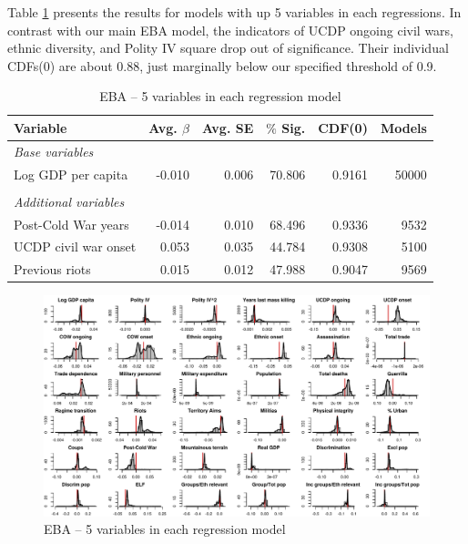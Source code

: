 Table \ref{tab:mk-5vars} presents the results for models with up 5 variables in each regressions. In contrast with our main EBA model, the indicators of UCDP ongoing civil wars, ethnic diversity, and Polity IV square drop out of significance. Their individual CDFs(0) are about 0.88, just marginally below our specified threshold of 0.9.

\vspace{1cm}

\begin{table}[!htpb]
\centering
\begin{tabular}{lrrrrr}
\hline
\textbf{Variable} & \textbf{Avg. $\beta$} & \textbf{Avg. SE} & \textbf{$\%$ Sig.} & \textbf{CDF(0)} & \textbf{Models} \\ \hline
\textit{Base variables} &  &  &  &  &  \\
Log GDP per capita & -0.010 & 0.006 & 70.806 & 0.9161 & 50000 \\
 &  &  &  &  &  \\
\textit{Additional variables} &  &  &  &  &  \\
Post-Cold War years & -0.014 & 0.010 & 68.496 & 0.9336 & 9532 \\
UCDP civil war onset & 0.053 & 0.035 & 44.784 & 0.9308 & 5100 \\
Previous riots & 0.015 & 0.012 & 47.988 & 0.9047 & 9569 \\\hline
\end{tabular}
\caption{EBA -- 5 variables in each regression model}
\label{tab:mk-5vars}
\end{table}

\clearpage
\begin{figure}
    \centering
    \includegraphics[width=\textwidth]{images/mk-5vars.pdf}
    \caption{EBA -- 5 variables in each regression model}
    \label{fig:mk-5vars}
\end{figure}
\clearpage

